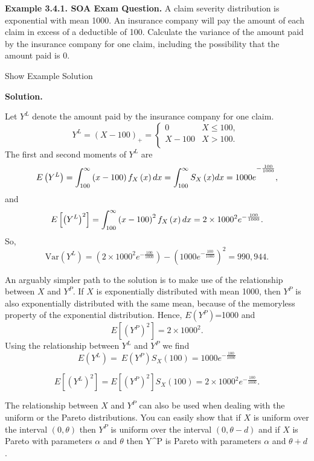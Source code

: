\documentclass[]{book}
\theoremstyle{definition}
\theoremstyle{definition}
\theoremstyle{definition}
\theoremstyle{remark}
\begin{document}
\textbf{Example 3.4.1. SOA Exam Question.} A claim severity distribution
is exponential with mean 1000. An insurance company will pay the amount
of each claim in excess of a deductible of 100. Calculate the variance
of the amount paid by the insurance company for one claim, including the
possibility that the amount paid is 0.

Show Example Solution

\hypertarget{toggleExampleLoss.4.1}{}
\textbf{Solution.}

Let \(Y^{L}\) denote the amount paid by the insurance company for one
claim. \[Y^{L} = \left( X - 100 \right)_{+} = \left\{ \begin{matrix}
0 & X \leq 100, \\
X - 100 & X > 100. \\
\end{matrix} \right.\ \] The first and second moments of \(Y^{L}\) are
\[E\left( Y^{L} \right) = \int_{100}^{\infty}\left( x - 100 \right)f_{X}\left( x \right)dx \\
= {\int_{100}^{\infty}{S_{X}\left( x \right)}dx = 1000e}^{- \frac{100}{1000}},\]
and
\[E\left\lbrack \left( Y^{L} \right)^{2} \right\rbrack = \int_{100}^{\infty}\left( x - 100 \right)^{2}f_{X}\left( x \right)dx \\\\
= 2 \times 1000^{2}e^{- \frac{100}{1000}}.\] So,
\[\mathrm{Var}\left( Y^{L} \right) = \left( 2 \times 1000^{2}e^{- \frac{100}{1000}} \right) - \left( {1000e}^{- \frac{100}{1000}} \right)^{2} = 990,944.\]

An arguably simpler path to the solution is to make use of the
relationship between \(X\) and \(Y^{P}\). If \(X\) is exponentially
distributed with mean 1000, then \(Y^{P}\) is also exponentially
distributed with the same mean, because of the memoryless property of
the exponential distribution. Hence, \(E\left( Y^{P} \right)\)=1000 and
\[E\left\lbrack \left( Y^{P} \right)^{2} \right\rbrack = 2 \times 1000^{2}.\]
Using the relationship between \(Y^{L}\) and \(Y^{P}\) we find
\[E\left( Y^{L} \right) = \ E\left( Y^{P} \right)S_{X}\left( 100 \right){= 1000e}^{- \frac{100}{1000}}\]

\[E\left\lbrack \left( Y^{L} \right)^{2} \right\rbrack = E\left\lbrack \left( Y^{P} \right)^{2} \right\rbrack S_{X}\left( 100 \right) = 2 \times 1000^{2}e^{- \frac{100}{1000}}.\]

The relationship between \(X\) and \(Y^P\) can also be used when dealing
with the uniform or the Pareto distributions. You can easily show that
if \(X\) is uniform over the interval \(\left(0,\theta\right)\) then
\(Y^P\) is uniform over the interval \(\left(0,\theta-d\right)\) and if
\(X\) is Pareto with parameters \(\alpha\) and \(\theta\) then Y\^{}P is
Pareto with parameters \(\alpha\) and \(\theta+d\).
\end{document}

